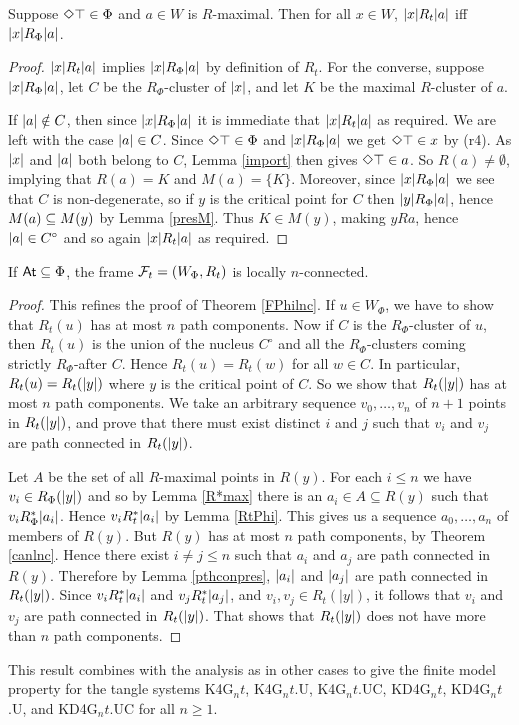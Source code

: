 \begin{lemma} \label{RtPhi}
Suppose $\Diamond\top\in\Phi$ and
$a\in W$ is $R$-maximal. Then for all $x\in W$, $|x|R_t|a|$ iff\/ $|x|R_\Phi|a|$.
\end{lemma}
\begin{proof}
$|x|R_t|a|$ implies $|x|R_\Phi|a|$ by definition of $R_t$. 
For the converse, suppose $|x|R_\Phi|a|$, let $C$ be the $R_\Phi$-cluster of $|x|$,
and let  $K$ be the maximal $R$-cluster of $a$. 

If $|a|\notin C$, then since $|x|R_\Phi|a|$ it is immediate that $|x|R_t|a|$ as required. We are left with the case  $|a|\in C$. Since $\Diamond\top\in\Phi$ and $|x|R_\Phi|a|$ we get  $\Diamond\top\in x$ by (r4).  As $|x|$ and $|a|$ both belong to $C$, Lemma \ref{import} then gives
 $\Diamond\top\in a$. So $R(a)\ne\emptyset$, implying that $R(a)=K$ and $M(a)=\{K\}$.
Moreover, since $|x|R_\Phi|a|$ we see that  $C$ is non-degenerate, so if $y$ is the critical point for $C$ then 
$|y|R_\Phi|a|$, hence $M(a)\subseteq M(y)$ by Lemma \ref{presM}. Thus $K\in M(y)$, making $yRa$, hence $|a|\in C^\circ$ and so again $|x|R_t|a|$ as required. 
\end{proof}


\begin{theorem}
If\/ $\mathsf{At}\subseteq\Phi$, the frame $\mathcal{F}_t=(W_\Phi,R_t)$ is locally $n$-connected.
\end{theorem}
\begin{proof}
This refines the proof of Theorem \ref{FPhilnc}. 
If $u\in W_\Phi$, we have to show that $R_t(u)$ has at most $n$ path components. 
Now if $C$ is the $R_\Phi$-cluster  of $u$, then $R_t(u)$ is the union of the nucleus $C^\circ$ and all the $R_\Phi$-clusters coming strictly $R_\Phi$-after $C$. Hence
$R_t(u)=R_t(w)$ for all $w\in C$. In particular, $R_t(u)=R_t(|y|)$ where
 $y$ is the critical point of $C$. So we show that  $R_t(|y|)$ has at most $n$ path components. We take  an arbitrary sequence $v_0,\dots,v_n$ of $n+1$ points in $R_t(|y|)$, and prove that there must exist distinct $i$ and $j$ such that $v_i$ and $v_j$ are path connected  in $R_t(|y|)$.

Let $A$ be the set of all $R$-maximal points in $R(y)$.
For each $i\leq n$ we have $v_i\in R_\Phi(|y|)$ and so
by Lemma \ref{R*max} there is an $a_i\in A\subseteq R(y)$ such that $v_iR_\Phi^*|a_i|$. Hence 
$v_iR_t^*|a_i|$ by Lemma \ref{RtPhi}.
 This gives us a sequence $a_0,\dots,a_n$   of  members of $R(y)$. But $R(y)$ has at most $n$ path components, by Theorem \ref{canlnc}. Hence there exist $i\ne j\leq n$ such that $a_i$ and $a_j$ are path connected in $R(y)$. Therefore by Lemma \ref{pthconpres},
$|a_i|$ and $|a_j| $ are path connected in $R_t(|y|)$. Since $v_iR_t^*|a_i|$ and $v_jR_t^*|a_j|$,
and $v_i,v_j\in R_t(|y|)$,
 it follows that 
$v_i$ and $v_j $ are path connected in $R_t(|y|)$. That shows that $R_t(|y|)$ does not have more than $n$ path components.
\end{proof}

This result combines with the analysis as in other cases to give the  finite model property for the tangle systems K4G$_nt$,    K4G$_nt$.U,  K4G$_nt$.UC, KD4G$_nt$, KD4G$_nt$.U,  and KD4G$_nt$.UC
for all $n\geq 1$.







